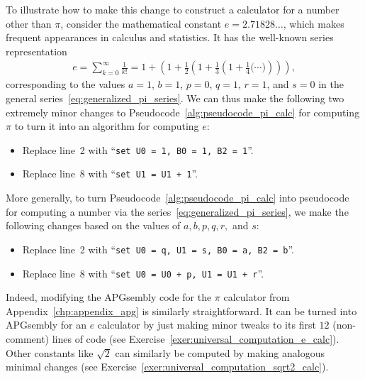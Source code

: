 To illustrate how to make this change to construct a calculator for a number other than $\pi$, consider the mathematical constant $e = 2.71828\ldots$, which makes frequent appearances in calculus and statistics. It has the well-known series representation
\begin{align}\label{eq:e_series}
e = \sum_{k=0}^\infty \frac{1}{k!} = 1 + \left(1 + \frac{1}{2}\left(1 + \frac{1}{3}\left(1 + \frac{1}{4}\Big( \cdots \Big)\right)\right)\right),
\end{align}
corresponding to the values $a = 1$, $b = 1$, $p = 0$, $q = 1$, $r = 1$, and $s = 0$ in the general series~\eqref{eq:generalized_pi_series}. We can thus make the following two extremely minor changes to Pseudocode~\ref{alg:pseudocode_pi_calc} for computing $\pi$ to turn it into an algorithm for computing $e$:\smallskip

\begin{itemize}
	\item Replace line~2 with ``\texttt{set U0 = 1, B0 = 1, B2 = 1}''.\smallskip
	
	\item Replace line~8 with ``\texttt{set U1 = U1 + 1}''.\smallskip
\end{itemize}

More generally, to turn Pseudocode~\ref{alg:pseudocode_pi_calc} into pseudocode for computing a number via the series~\eqref{eq:generalized_pi_series}, we make the following changes based on the values of $a,b,p,q,r,$ and $s$:\smallskip

\begin{itemize}
	\item Replace line~2 with ``\texttt{set U0 = q, U1 = s, B0 = a, B2 = b}''.\smallskip
	
	\item Replace line~8 with ``\texttt{set U0 = U0 + p, U1 = U1 + r}''.\smallskip
\end{itemize}

Indeed, modifying the APGsembly code for the $\pi$ calculator from Appendix~\ref{chp:appendix_apg} is similarly straightforward. It can be turned into APGsembly for an $e$ calculator by just making minor tweaks to its first $12$ (non-comment) lines of code (see Exercise~\ref{exer:universal_computation_e_calc}). Other constants like $\sqrt{2}$ can similarly be computed by making analogous minimal changes (see Exercise~\ref{exer:universal_computation_sqrt2_calc}).



